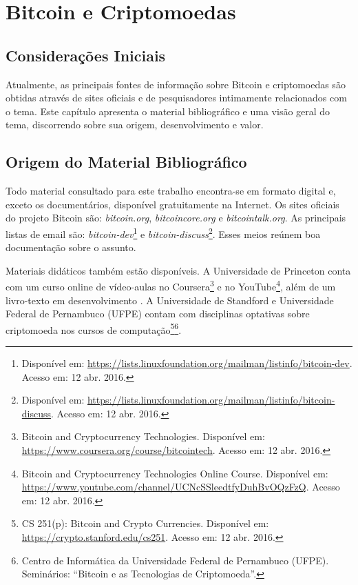 \chapter{Bitcoin e Criptomoedas}
\label{ch:bitcoin-intro}

\section{Considerações Iniciais}

Atualmente, as principais fontes de informação sobre Bitcoin e criptomoedas são obtidas através de sites oficiais e de pesquisadores intimamente relacionados com o tema. Este capítulo apresenta o material bibliográfico e uma visão geral do tema, discorrendo sobre sua origem, desenvolvimento e valor.

\section{Origem do Material Bibliográfico}

 Todo material consultado para este trabalho encontra-se em formato digital e, exceto os documentários, disponível gratuitamente na Internet. Os sites oficiais do projeto Bitcoin são: \textit{bitcoin.org}, \textit{bitcoincore.org} e \textit{bitcointalk.org}. As principais listas de email são: \textit{bitcoin-dev}\footnote{Disponível em: \url{https://lists.linuxfoundation.org/mailman/listinfo/bitcoin-dev}. Acesso em: 12 abr. 2016.} e \textit{bitcoin-discuss}\footnote{Disponível em: \url{https://lists.linuxfoundation.org/mailman/listinfo/bitcoin-discuss}. Acesso em: 12 abr. 2016.}. Esses meios reúnem boa documentação sobre o assunto.

Materiais didáticos também estão disponíveis. A Universidade de Princeton conta com um curso online de vídeo-aulas no Coursera\footnote{Bitcoin and Cryptocurrency Technologies. Disponível em: \url{https://www.coursera.org/course/bitcointech}. Acesso em: 12 abr. 2016.} e no YouTube\footnote{Bitcoin and Cryptocurrency Technologies Online Course. Disponível em: \url{https://www.youtube.com/channel/UCNcSSleedtfyDuhBvOQzFzQ}. Acesso em: 12 abr. 2016.}, além de um livro-texto em desenvolvimento \cite{bib:princeton-book}. A Universidade de Standford e Universidade Federal de Pernambuco (UFPE) contam com disciplinas optativas sobre criptomoeda nos cursos de computação\footnote{CS 251(p): Bitcoin and Crypto Currencies. Disponível em: \url{https://crypto.stanford.edu/cs251}. Acesso em: 12 abr. 2016.}\footnote{Centro de Informática da Universidade Federal de Pernambuco (UFPE). Seminários: ``Bitcoin e as Tecnologias de Criptomoeda''.}.

